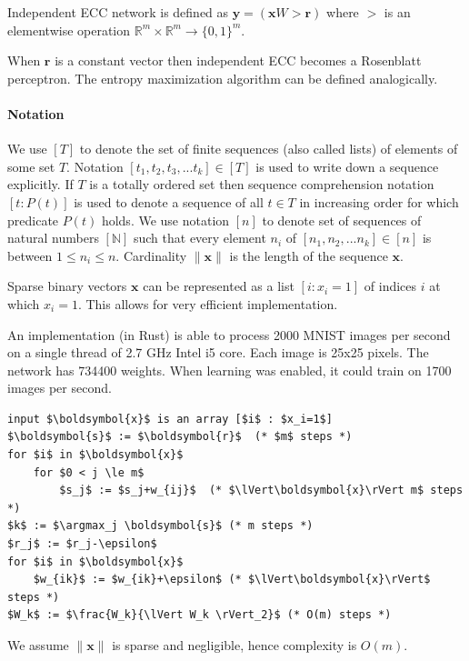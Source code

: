 \documentclass[oneside,english,logo]{amuthesis}
\DeclareMathOperator*{\argmax}{argmax}
\begin{document}
\begin{definition}
Independent ECC network is defined as $\boldsymbol{y} = (\boldsymbol{x}W > \boldsymbol{r})$ where $>$ is an elementwise operation $\mathbb{R}^m \times \mathbb{R}^m \rightarrow \{0,1\}^m$.
\end{definition}
When $\boldsymbol{r}$ is a constant vector then independent ECC becomes a Rosenblatt perceptron.
The entropy maximization algorithm can be defined analogically. 
\fi

\paragraph{Notation} We use $[T]$ to denote the set of finite sequences (also called lists) of elements of some set $T$. Notation $[t_1,t_2,t_3,...t_k] \in [T]$ is used to write down a sequence explicitly. If $T$ is a totally ordered set then sequence comprehension notation $[t : P(t)]$ is used to denote a sequence of all $t\in T$ in increasing order for which predicate $P(t)$ holds. We use notation $[n]$ to denote set of sequences of natural numbers $[\mathbb{N}]$ such that every element $n_i$ of $[n_1,n_2,...n_k]\in [n]$ is between $1 \le n_i \le n$. Cardinality $\lVert \boldsymbol{x} \rVert$ is the length of the sequence $\boldsymbol{x}$.

Sparse binary vectors $\boldsymbol{x}$ can be represented as a list $[i:x_i=1]$ of indices $i$ at which $x_i=1$. This allows for very efficient implementation.
\begin{example} \label{example:ecc_efficient_impl}
An implementation (in Rust) is able to process 2000 MNIST images per second on a single thread of 2.7 GHz Intel i5 core. Each image is 25x25 pixels. The network has 734400 weights. When learning was enabled, it could train on 1700 images per second. 
\begin{lstlisting}
input $\boldsymbol{x}$ is an array [$i$ : $x_i=1$]
$\boldsymbol{s}$ := $\boldsymbol{r}$  (* $m$ steps *)
for $i$ in $\boldsymbol{x}$   
    for $0 < j \le m$ 
        $s_j$ := $s_j+w_{ij}$  (* $\lVert\boldsymbol{x}\rVert m$ steps *)
$k$ := $\argmax_j \boldsymbol{s}$ (* m steps *)
$r_j$ := $r_j-\epsilon$
for $i$ in $\boldsymbol{x}$ 
    $w_{ik}$ := $w_{ik}+\epsilon$ (* $\lVert\boldsymbol{x}\rVert$ steps *)
$W_k$ := $\frac{W_k}{\lVert W_k \rVert_2}$ (* O(m) steps *)
\end{lstlisting}
We assume $\lVert \boldsymbol{x}\rVert$ is sparse and negligible, hence complexity is $O(m)$. 

\end{example}
\end{document}
